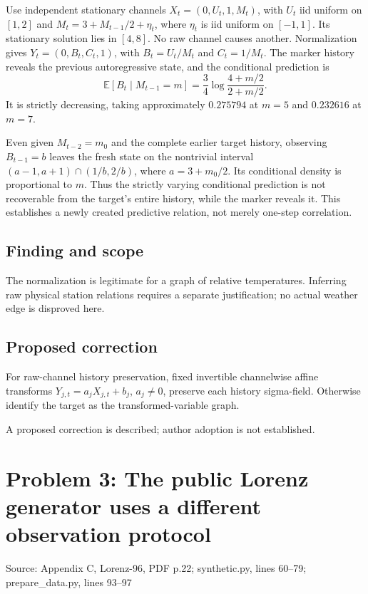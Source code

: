 \documentclass[11pt]{article}
\begin{document}
Use independent stationary channels \(X_t=(0,U_t,1,M_t)\), with \(U_t\) iid uniform on \([1,2]\) and \(M_t=3+M_{t-1}/2+\eta_t\), where \(\eta_t\) is iid uniform on \([-1,1]\). Its stationary solution lies in \([4,8]\). No raw channel causes another. Normalization gives \(Y_t=(0,B_t,C_t,1)\), with \(B_t=U_t/M_t\) and \(C_t=1/M_t\). The marker history reveals the previous autoregressive state, and the conditional prediction is \[\mathbb E[B_t\mid M_{t-1}=m]=\frac34\log\frac{4+m/2}{2+m/2}.\] It is strictly decreasing, taking approximately \(0.275794\) at \(m=5\) and \(0.232616\) at \(m=7\).

Even given \(M_{t-2}=m_0\) and the complete earlier target history, observing \(B_{t-1}=b\) leaves the fresh state on the nontrivial interval \((a-1,a+1)\cap(1/b,2/b)\), where \(a=3+m_0/2\). Its conditional density is proportional to \(m\). Thus the strictly varying conditional prediction is not recoverable from the target’s entire history, while the marker reveals it. This establishes a newly created predictive relation, not merely one-step correlation.

\subsection*{Finding and scope}

The normalization is legitimate for a graph of relative temperatures. Inferring raw physical station relations requires a separate justification; no actual weather edge is disproved here.

\subsection*{Proposed correction}

For raw-channel history preservation, fixed invertible channelwise affine transforms \(Y_{j,t}=a_jX_{j,t}+b_j\), \(a_j\ne0\), preserve each history sigma-field. Otherwise identify the target as the transformed-variable graph.

A proposed correction is described; author adoption is not established.

\section*{Problem 3: The public Lorenz generator uses a different observation protocol}

Source: Appendix C, Lorenz-96, PDF p.22; synthetic.py, lines 60–79; prepare\_data.py, lines 93–97
\end{document}
